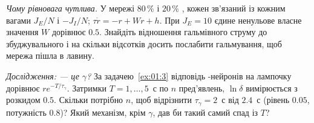 \begin{exercise}[\lvlB]
\label{ex:01:6}
\emph{Чому рівновага чутлива.} У мережі $80\,\%$  і $20\,\%$ , кожен зв'язаний із кожним вагами $J_E/N$ і $-J_I/N$; $\tau\dot r=-r+Wr+h$. При $J_E=10$ єдине ненульове власне значення $W$ дорівнює $0.5$. Знайдіть відношення гальмівного струму до збуджувального і на скільки відсотків досить послабити гальмування, щоб мережа пішла в лавину.
\end{exercise}

\begin{exercise}[\lvlC]
\label{ex:01:7}
\emph{Дослідження:  --- це $\gamma$?} За задачею~\ref{ex:01:3} відповідь -нейронів на лампочку дорівнює $re^{-T/\tau_\gamma}$. Затримки $T=1,\dots,5$~с по $n$ пред'явлень, $\ln\delta$ вимірюється з розкидом $0.5$. Скільки потрібно $n$, щоб відрізнити $\tau_\gamma=2$~с від $2.4$~с (рівень $0.05$, потужність $0.8$)? Який механізм, крім $\gamma$, дав би такий самий спад із $T$?
\end{exercise}
